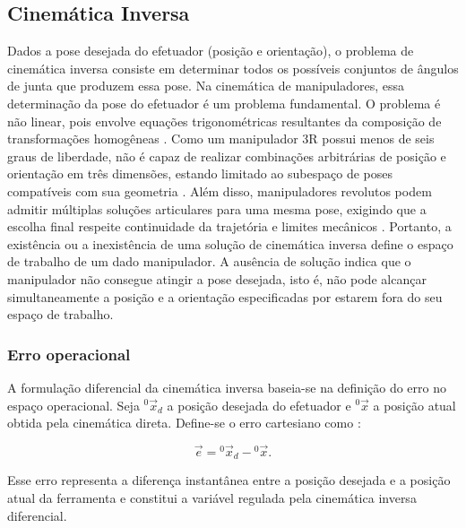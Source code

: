 \subsection{Cinemática Inversa}
\label{sec:cinematica_inversa}

Dados a pose desejada do efetuador (posição e orientação), o problema de cinemática inversa consiste em determinar todos os possíveis conjuntos de ângulos de junta que produzem essa pose. Na cinemática de manipuladores, essa determinação da pose do efetuador é um problema fundamental.
O problema é não linear, pois envolve equações trigonométricas resultantes da composição de transformações homogêneas \cite{craig2005,spong2006robot}.
Como um manipulador 3R possui menos de seis graus de liberdade, não é capaz de realizar combinações arbitrárias de posição e orientação em três dimensões, estando limitado ao subespaço de poses compatíveis com sua geometria \cite{craig2005}.
Além disso, manipuladores revolutos podem admitir múltiplas soluções articulares para uma mesma pose, exigindo que a escolha final respeite continuidade da trajetória e limites mecânicos \cite{craig2005}.
Portanto, a existência ou a inexistência de uma solução de cinemática inversa define o espaço de trabalho de um dado manipulador. A ausência de solução indica que o manipulador não consegue atingir a pose desejada, isto é, não pode alcançar simultaneamente a posição e a orientação especificadas por estarem fora do seu espaço de trabalho.

\subsubsection{Erro operacional}

A formulação diferencial da cinemática inversa baseia-se na definição do erro no espaço operacional. Seja ${}^{0}\!\vec{x}_{d}$ a posição desejada do efetuador e ${}^{0}\!\vec{x}$ a posição atual obtida pela cinemática direta. Define-se o erro cartesiano como \cite{sciavicco_siciliano2010}:

\begin{equation}
\label{eq:erro_operacional}
\vec{e}
=
{}^{0}\!\vec{x}_{d}
-
{}^{0}\!\vec{x}.
\end{equation}

Esse erro representa a diferença instantânea entre a posição desejada e a posição atual da ferramenta e constitui a variável regulada pela cinemática inversa diferencial.

